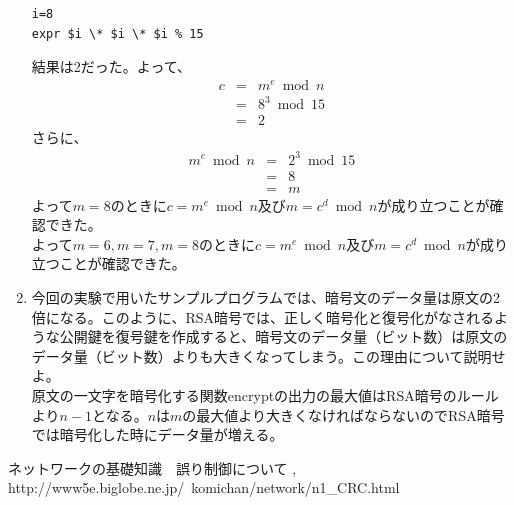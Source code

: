 \documentclass[a4j]{celb-report}
\begin{document}
\begin{enumerate}
\begin{lstlisting}[basicstyle=\ttfamily\footnotesize, frame=single]
i=8
expr $i \* $i \* $i % 15
\end{lstlisting}
結果は2だった。よって、
\begin{eqnarray}
	c & = & m ^e \bmod n \nonumber \\
	& = & 8 ^3 \bmod 15 \nonumber \\
	& = & 2 \nonumber
\end{eqnarray}
さらに、
\begin{eqnarray}
	m ^e \bmod n & = & 2 ^3 \bmod 15 \nonumber \\
	& = & 8 \nonumber \\
	& = & m \nonumber
\end{eqnarray}
よって$ m = 8 $のときに$ c = m ^e \bmod n $及び$ m = c ^d \bmod n $が成り立つことが確認できた。\\
よって$ m = 6 , m = 7 , m = 8 $のときに$ c = m ^e \bmod n $及び$ m = c ^d \bmod n $が成り立つことが確認できた。
	\item 今回の実験で用いたサンプルプログラムでは、暗号文のデータ量は原文の2倍になる。このように、RSA暗号では、正しく暗号化と復号化がなされるような公開鍵を復号鍵を作成すると、暗号文のデータ量（ビット数）は原文のデータ量（ビット数）よりも大きくなってしまう。この理由について説明せよ。\\
原文の一文字を暗号化する関数encryptの出力の最大値はRSA暗号のルールより$ n - 1 $となる。$ n $は$ m $の最大値より大きくなければならないのでRSA暗号では暗号化した時にデータ量が増える。
\end{enumerate}
\begin{thebibliography}{9}
 ネットワークの基礎知識　誤り制御について , http://www5e.biglobe.ne.jp/~komichan/network/n1\_CRC.html
\end{thebibliography}
%
\end{document}
